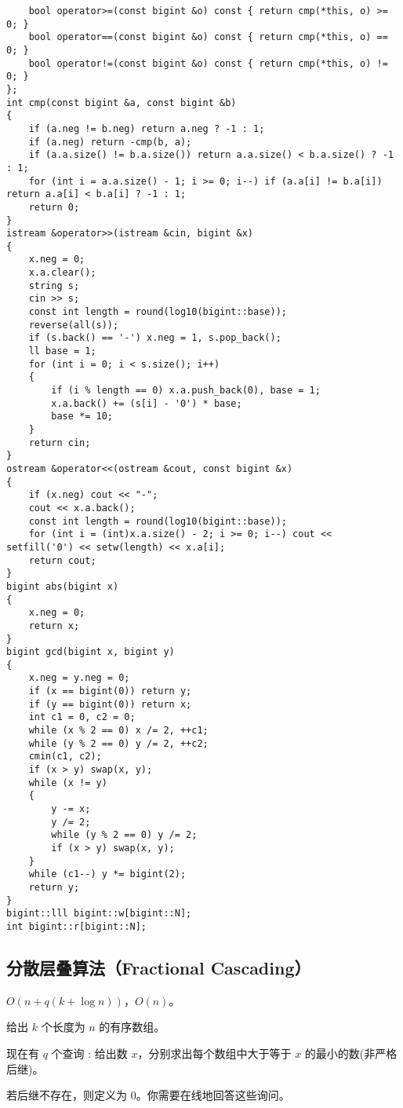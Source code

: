 \documentclass[12pt]{ctexart}
\begin{document}
\begin{lstlisting}
	bool operator>=(const bigint &o) const { return cmp(*this, o) >= 0; }
	bool operator==(const bigint &o) const { return cmp(*this, o) == 0; }
	bool operator!=(const bigint &o) const { return cmp(*this, o) != 0; }
};
int cmp(const bigint &a, const bigint &b)
{
	if (a.neg != b.neg) return a.neg ? -1 : 1;
	if (a.neg) return -cmp(b, a);
	if (a.a.size() != b.a.size()) return a.a.size() < b.a.size() ? -1 : 1;
	for (int i = a.a.size() - 1; i >= 0; i--) if (a.a[i] != b.a[i]) return a.a[i] < b.a[i] ? -1 : 1;
	return 0;
}
istream &operator>>(istream &cin, bigint &x)
{
	x.neg = 0;
	x.a.clear();
	string s;
	cin >> s;
	const int length = round(log10(bigint::base));
	reverse(all(s));
	if (s.back() == '-') x.neg = 1, s.pop_back();
	ll base = 1;
	for (int i = 0; i < s.size(); i++)
	{
		if (i % length == 0) x.a.push_back(0), base = 1;
		x.a.back() += (s[i] - '0') * base;
		base *= 10;
	}
	return cin;
}
ostream &operator<<(ostream &cout, const bigint &x)
{
	if (x.neg) cout << "-";
	cout << x.a.back();
	const int length = round(log10(bigint::base));
	for (int i = (int)x.a.size() - 2; i >= 0; i--) cout << setfill('0') << setw(length) << x.a[i];
	return cout;
}
bigint abs(bigint x)
{
	x.neg = 0;
	return x;
}
bigint gcd(bigint x, bigint y)
{
	x.neg = y.neg = 0;
	if (x == bigint(0)) return y;
	if (y == bigint(0)) return x;
	int c1 = 0, c2 = 0;
	while (x % 2 == 0) x /= 2, ++c1;
	while (y % 2 == 0) y /= 2, ++c2;
	cmin(c1, c2);
	if (x > y) swap(x, y);
	while (x != y)
	{
		y -= x;
		y /= 2;
		while (y % 2 == 0) y /= 2;
		if (x > y) swap(x, y);
	}
	while (c1--) y *= bigint(2);
	return y;
}
bigint::lll bigint::w[bigint::N];
int bigint::r[bigint::N];
\end{lstlisting}

\subsection{分散层叠算法（Fractional Cascading）}

$O(n+q(k+\log n))$，$O(n)$。

给出 $k$ 个长度为 $n$ 的有序数组。

现在有 $q$ 个查询 : 给出数 $x$，分别求出每个数组中大于等于 $x$ 的最小的数(非严格后继)。

若后继不存在，则定义为 $0$。你需要在线地回答这些询问。
\end{document}
